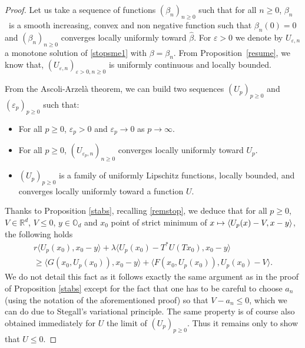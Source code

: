 \documentclass[10pt]{amsart}
\newcommand\mto{\mathchoice{\longmapsto}{\mapsto}{\mapsto}{\mapsto}}
\let\epsilon\varepsilon
\theoremstyle{definition}
\begin{document}
\begin{proof}
Let us take a sequence of functions $(\beta_n)_{n \geq 0}$ such that for all $n \geq 0$, $\beta_n$~is a smooth increasing, convex and non negative function such that $\beta_n(0)= 0$ and $(\beta_n)_{n \geq 0}$ converges locally uniformly toward $\hat{\beta}$. For $\epsilon > 0$ we denote by $U_{\epsilon,n}$ a monotone solution of \eqref{stopsme1} with $\beta = \beta_n$. From Proposition~\ref{resume}, we know that, $(U_{\epsilon,n})_{\epsilon> 0, n \geq 0}$ is uniformly continuous and locally bounded.

From the Ascoli-Arzelà theorem, we can build two sequences $(U_p)_{p \geq 0}$ and $(\epsilon_p)_{p \geq 0}$ such that:
\begin{itemize}
\item For all $p \geq 0$, $\epsilon_p > 0$ and $\epsilon_p \to 0$ as $p \to \infty$.
\item For all $p \geq 0$, $(U_{\epsilon_p,n})_{n \geq 0}$ converges locally uniformly toward $U_p$.
\item $(U_p)_{p \geq 0}$ is a family of uniformly Lipschitz functions, locally bounded, and converges locally uniformly toward a function $U$.
\end{itemize}
Thanks to Proposition \ref{stabs}, recalling \eqref{remstop}, we deduce that for all $p \geq 0$, $V \in \mathbb{R}^d$, $V \leq 0$, $y \in \mathbb{O}_d$ and $x_0$ point of strict minimum of $x \mto \langle U_p(x)-V, x-y\rangle$, the following holds
\begin{multline*}
r \langle U_p(x_0), x_0-y \rangle+\lambda \langle U_p(x_0)-T^*U(Tx_0),x_0-y\rangle \\
\geq
\langle G(x_0,U_p(x_0)), x_0- y \rangle+\langle F(x_0,U_p(x_0)), U_p(x_0)-V \rangle.
\end{multline*}
We do not detail this fact as it follows exactly the same argument as in the proof of Proposition \ref{stabs} except for the fact that one has to be careful to choose $a_n$ (using the notation of the aforementioned proof) so that $V-a_n \leq 0$, which we can do due to Stegall's variational principle. The same property is of course also obtained immediately for $U$ the limit of $(U_p)_{p \geq 0}$. Thus it remains only to show that $U \leq 0$.


\end{proof}
\end{document}
